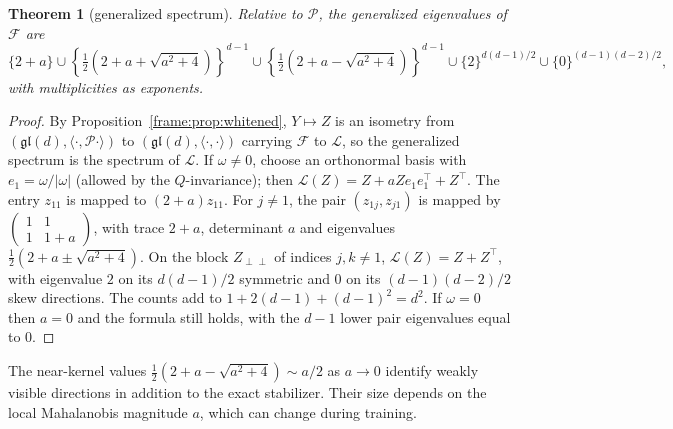 \documentclass[11pt]{article}
\newtheorem{theorem}{Theorem}[section]
\theoremstyle{definition}
\theoremstyle{remark}
\providecommand{\gl}{\mathfrak{gl}}
\providecommand{\ip}[2]{\langle #1, #2\rangle}
\begin{document}
\begin{theorem}[generalized spectrum]\label{frame:thm:spectrum}
Relative to $\mathcal{P}$, the generalized eigenvalues of $\mathcal{F}$ are
\begin{equation}\label{frame:eq:spectrum}
\{2+a\}\cup\left\{\tfrac12\left(2+a+\sqrt{a^2+4}\right)\right\}^{d-1}\cup\left\{\tfrac12\left(2+a-\sqrt{a^2+4}\right)\right\}^{d-1}\cup\{2\}^{d(d-1)/2}\cup\{0\}^{(d-1)(d-2)/2},
\end{equation}
with multiplicities as exponents.
\end{theorem}
\begin{proof}
By Proposition~\ref{frame:prop:whitened}, $Y\mapsto Z$ is an isometry from $(\gl(d),\ip{\cdot}{\mathcal{P}\cdot})$ to $(\gl(d),\ip{\cdot}{\cdot})$ carrying $\mathcal{F}$ to $\mathcal{L}$, so the generalized spectrum is the spectrum of $\mathcal{L}$. If $\omega\neq0$, choose an orthonormal basis with $e_1=\omega/|\omega|$ (allowed by the $Q$-invariance); then $\mathcal{L}(Z)=Z+aZe_1e_1^\top+Z^\top$. The entry $z_{11}$ is mapped to $(2+a)z_{11}$. For $j\neq1$, the pair $(z_{1j},z_{j1})$ is mapped by $\begin{pmatrix}1&1\\1&1+a\end{pmatrix}$, with trace $2+a$, determinant $a$ and eigenvalues $\frac12(2+a\pm\sqrt{a^2+4})$. On the block $Z_{\perp\perp}$ of indices $j,k\neq1$, $\mathcal{L}(Z)=Z+Z^\top$, with eigenvalue $2$ on its $d(d-1)/2$ symmetric and $0$ on its $(d-1)(d-2)/2$ skew directions. The counts add to $1+2(d-1)+(d-1)^2=d^2$. If $\omega=0$ then $a=0$ and the formula still holds, with the $d-1$ lower pair eigenvalues equal to $0$.
\end{proof}

The near-kernel values \(\frac12(2+a-\sqrt{a^2+4})\sim a/2\) as \(a\to0\) identify weakly visible directions in addition to the exact stabilizer. Their size depends on the local Mahalanobis magnitude \(a\), which can change during training.
\end{document}
